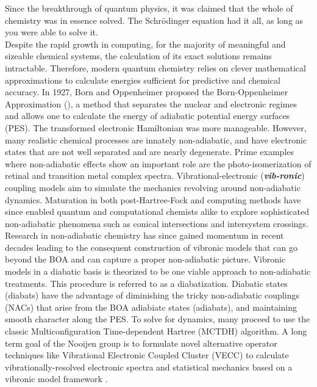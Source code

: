 Since the breakthrough of quantum physics, it was claimed that the whole of chemistry was in essence solved. The Schrödinger equation had it all, as long as you were able to solve it. \\Despite the rapid growth in computing, for the majority of meaningful and sizeable chemical systems, the calculation of its exact solutions remains intractable. Therefore, modern quantum chemistry relies on clever mathematical approximations to calculate energies sufficient for predictive and chemical accuracy. In 1927, Born and Oppenheimer proposed the Born-Oppenheimer Approximation (), a method that separates the nuclear and electronic regimes and allows one to calculate the energy of adiabatic potential energy surfaces (PES). The transformed electronic Hamiltonian was more manageable. However, many realistic chemical processes are innately non-adiabatic, and have electronic states that are not well separated and are nearly degenerate. Prime examples where non-adiabatic effects show an important role are the photo-isomerization of retinal and
transition metal complex spectra. 
Vibrational-electronic (\textbf{\textit{vib-ronic}}) coupling models aim to simulate the mechanics revolving around non-adiabatic dynamics. Maturation in both post-Hartree-Fock and computing methods have since enabled quantum and computational chemists alike to explore sophisticated non-adiabatic phenomena such as conical intersections and intersystem crossings. \\ Research in non-adiabatic chemistry has since gained momentum in recent decades leading to the consequent construction of vibronic models that can go beyond the BOA and can capture a proper non-adiabatic picture. Vibronic models in a diabatic basis is theorized to be one viable approach to non-adiabatic treatments. This procedure is referred to as a diabatization. Diabatic states (diabats) have the advantage of diminishing the tricky non-adiabatic couplings (NACs) that arise from the BOA adiabiatc states (adiabats), and maintaining smooth character along the PES. To solve for dynamics, many proceed to use the classic Multiconfiguration Time-dependent Hartree (MCTDH) algorithm. A long term goal of the Nooijen group is to formulate novel alternative operator techniques like Vibrational Electronic Coupled Cluster (VECC) to calculate vibrationally-resolved electronic spectra and statistical mechanics based on a vibronic model framework \cite{10.1063/5.0190034}. 

